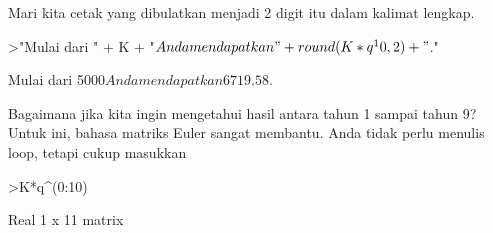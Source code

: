 \documentclass[12pt,Times new roman,letterpaper]{book}
\begin{document}
\begin{eulernootebook}
\begin{eulercomment}
\begin{eulercomment}
\begin{eulernootebook}
\begin{eulercomment}
\begin{eulercomment}
\begin{eulercomment}
\begin{eulercomment}
\begin{eulercomment}
\begin{eulercomment}
\begin{euleroutput}
\end{euleroutput}
\begin{eulercomment}
Mari kita cetak yang dibulatkan menjadi 2 digit itu dalam kalimat
lengkap.
\end{eulercomment}
\begin{eulerprompt}
>"Mulai dari " + K + "$ Anda mendapatkan " + round(K*q^10,2) + "$."
\end{eulerprompt}
\begin{euleroutput}
  Mulai dari 5000$ Anda mendapatkan 6719.58$.
\end{euleroutput}
\begin{eulercomment}
Bagaimana jika kita ingin mengetahui hasil antara tahun 1 sampai tahun
9? Untuk ini, bahasa matriks Euler sangat membantu. Anda tidak perlu
menulis loop, tetapi cukup masukkan
\end{eulercomment}
\begin{eulerprompt}
>K*q^(0:10)
\end{eulerprompt}
\begin{euleroutput}
  Real 1 x 11 matrix
  

\end{euleroutput}
\end{eulercomment}
\end{eulercomment}
\end{eulercomment}
\end{eulercomment}
\end{eulercomment}
\end{eulercomment}
\end{eulernootebook}
\end{eulercomment}
\end{eulercomment}
\end{eulernootebook}
\end{document}
